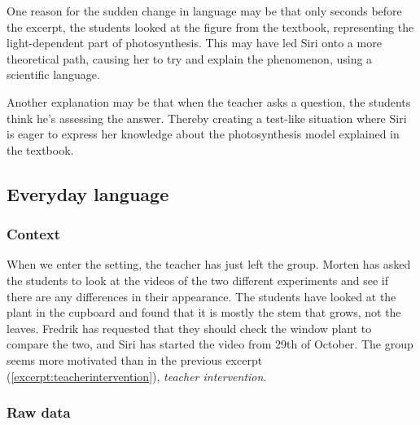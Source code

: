 One reason for the sudden change in language may be that only seconds before the excerpt, the students looked at the figure from the textbook, representing the light-dependent part of photosynthesis. This may have led Siri onto a more theoretical path, causing her to try and explain the phenomenon, using a scientific language. 

Another explanation may be that when the teacher asks a question, the students think he's assessing the answer. Thereby creating a test-like situation where Siri is eager to express her knowledge about the photosynthesis model explained in the textbook. 



\subsection{Everyday language}


\subsubsection*{Context}
When we enter the setting, the teacher has just left the group. Morten has asked the students to look at the videos of the two different experiments and see if there are any differences in their appearance. The students have looked at the plant in the cupboard and found that it is mostly the stem that grows, not the leaves. Fredrik has requested that they should check the window plant to compare the two, and Siri has started the video from 29th of October. The group seems more motivated than in the previous excerpt (\ref{excerpt:teacherintervention}), \textit{teacher intervention}.


\subsubsection*{Raw data}


